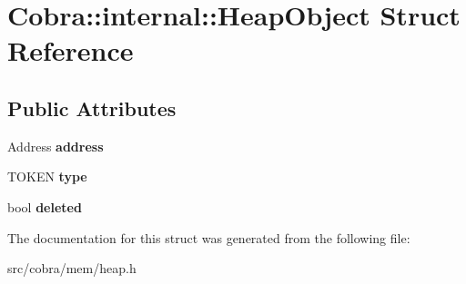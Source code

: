 \hypertarget{struct_cobra_1_1internal_1_1_heap_object}{\section{Cobra\+:\+:internal\+:\+:Heap\+Object Struct Reference}
\label{struct_cobra_1_1internal_1_1_heap_object}
}
\subsection*{Public Attributes}
\begin{DoxyCompactItemize}
\item 
\hypertarget{struct_cobra_1_1internal_1_1_heap_object_a7e738771f7dcbaabae86a8f18a843a3f}{Address {\bfseries address}}\label{struct_cobra_1_1internal_1_1_heap_object_a7e738771f7dcbaabae86a8f18a843a3f}

\item 
\hypertarget{struct_cobra_1_1internal_1_1_heap_object_abce58b1b7a4320de4700d2c0b9e1442a}{T\+O\+K\+E\+N {\bfseries type}}\label{struct_cobra_1_1internal_1_1_heap_object_abce58b1b7a4320de4700d2c0b9e1442a}

\item 
\hypertarget{struct_cobra_1_1internal_1_1_heap_object_a71a515760fb07ce88436355e7b24e3d2}{bool {\bfseries deleted}}\label{struct_cobra_1_1internal_1_1_heap_object_a71a515760fb07ce88436355e7b24e3d2}

\end{DoxyCompactItemize}


The documentation for this struct was generated from the following file\+:\begin{DoxyCompactItemize}
\item 
src/cobra/mem/heap.\+h\end{DoxyCompactItemize}
